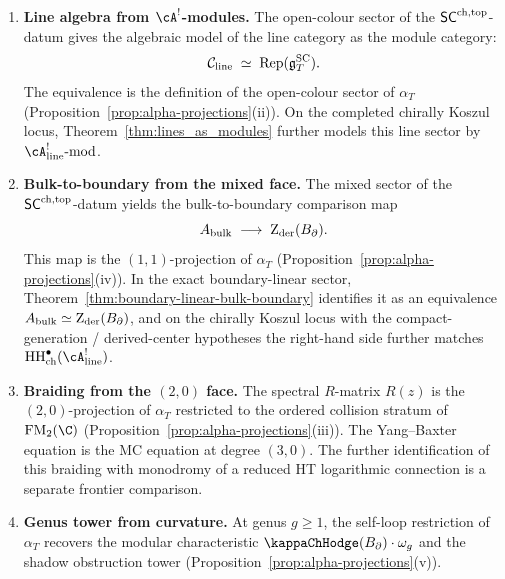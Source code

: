 \begin{theorem}
\begin{enumerate}[label=\textup{(\roman*)}]
 \item \textbf{Line algebra from $\cA^!$-modules.}
 The open-colour sector of the $\mathsf{SC}^{\mathrm{ch,top}}$-datum gives the algebraic
 model of the line category as the module category:
 \[
 \mathcal C_{\mathrm{line}}
 \;\simeq\;
 \mathrm{Rep}(\mathfrak{g}^{\mathrm{SC}}_T).
 \]
 The equivalence is the definition of the open-colour sector
 of $\alpha_T$
 \textup{(}Proposition~\textup{\ref{prop:alpha-projections}(ii)}\textup{)}.
 On the completed chirally Koszul locus,
 Theorem~\textup{\ref{thm:lines_as_modules}} further models this line
 sector by
 $\cA^!_{\mathrm{line}}\textup{-mod}$.

\item \textbf{Bulk-to-boundary from the mixed face.}
 The mixed sector of the $\mathsf{SC}^{\mathrm{ch,top}}$-datum yields the
 bulk-to-boundary comparison map
 \[
 A_{\mathrm{bulk}}
 \;\longrightarrow\;
 \operatorname{Z}_{\mathrm{der}}(B_{\partial}).
 \]
 This map is the $(1,1)$-projection of
 $\alpha_T$
 \textup{(}Proposition~\textup{\ref{prop:alpha-projections}(iv)}\textup{)}.
 In the exact boundary-linear sector,
 Theorem~\textup{\ref{thm:boundary-linear-bulk-boundary}} identifies
 it as an equivalence
 $A_{\mathrm{bulk}} \simeq \operatorname{Z}_{\mathrm{der}}(B_{\partial})$, and on the chirally Koszul locus
 with the compact-generation / derived-center hypotheses the
 right-hand side further matches
 $\HH^\bullet_{\mathrm{ch}}(\cA^!_{\mathrm{line}})$.

\item \textbf{Braiding from the $(2,0)$ face.}
 The spectral $R$-matrix $R(z)$ is the
 $(2,0)$-projection of $\alpha_T$ restricted to
 the ordered collision stratum of $\FM_2(\C)$
 \textup{(}Proposition~\textup{\ref{prop:alpha-projections}(iii)}\textup{)}.
 The Yang--Baxter equation is the MC equation at degree $(3,0)$.
 The further identification of this braiding with monodromy of a reduced HT
 logarithmic connection is a separate frontier comparison.

\item \textbf{Genus tower from curvature.}
 At genus $g \ge 1$, the self-loop restriction of $\alpha_T$
 recovers the modular characteristic $\kappaChHodge(\Bbound)\cdot\omega_g$
 and the shadow obstruction tower
 \textup{(}Proposition~\textup{\ref{prop:alpha-projections}(v)}\textup{)}.
\end{enumerate}
\end{theorem}

